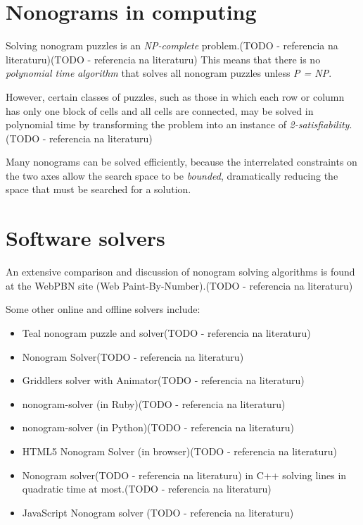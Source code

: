 \chapter{Nonograms in computing}
Solving nonogram puzzles is an \textit{NP-complete} problem.(TODO - referencia na literaturu)(TODO - referencia na literaturu)  This means that there is no \textit{polynomial time} \textit{algorithm} that solves all nonogram puzzles unless \textit{P = NP}.

However, certain classes of puzzles, such as those in which each row or column has only one block of cells and all cells are connected, may be solved in polynomial time by transforming the problem into an instance of \textit{2-satisfiability}.(TODO - referencia na literaturu)

Many nonograms can be solved efficiently, because the interrelated constraints on the two axes allow the search space to be \textit{bounded}, dramatically reducing the space that must be searched for a solution.


\chapter{Software solvers}

An extensive comparison and discussion of nonogram solving algorithms is found at the WebPBN site (Web Paint-By-Number).(TODO - referencia na literaturu)

Some other online and offline solvers include:


\begin{itemize} 
 \item {Teal nonogram puzzle and solver(TODO - referencia na literaturu)}

\item {Nonogram Solver(TODO - referencia na literaturu)}

\item {Griddlers solver with Animator(TODO - referencia na literaturu)}

\item {nonogram-solver (in Ruby)(TODO - referencia na literaturu)}

\item {nonogram-solver (in Python)(TODO - referencia na literaturu)}

\item {HTML5 Nonogram Solver (in browser)(TODO - referencia na literaturu)}

\item {Nonogram solver(TODO - referencia na literaturu) in C++ solving lines in quadratic time at most.(TODO - referencia na literaturu)}

\item {JavaScript Nonogram solver (TODO - referencia na literaturu)} 
\end{itemize}



